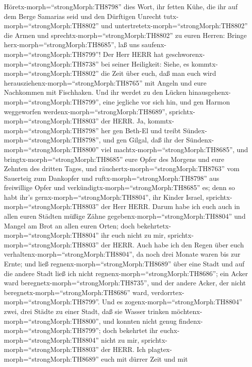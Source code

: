  Höretx-morph=``strongMorph:TH8798'' dies Wort, ihr fetten
Kühe, die ihr auf dem Berge Samarias seid und den Dürftigen Unrecht
tutx-morph=``strongMorph:TH8802'' und
untertretetx-morph=``strongMorph:TH8802'' die Armen und
sprechtx-morph=``strongMorph:TH8802'' zu euren Herren: Bringe
herx-morph=``strongMorph:TH8685'', laß uns
saufenx-morph=``strongMorph:TH8799''!  Der Herr HERR hat
geschworenx-morph=``strongMorph:TH8738'' bei seiner Heiligkeit: Siehe,
es kommtx-morph=``strongMorph:TH8802'' die Zeit über euch, daß man euch
wird herausziehenx-morph=``strongMorph:TH8765'' mit Angeln und eure
Nachkommen mit Fischhaken.  Und ihr werdet zu den Lücken
hinausgehenx-morph=``strongMorph:TH8799'', eine jegliche vor sich hin,
und gen Harmon weggeworfen werdenx-morph=``strongMorph:TH8689'',
sprichtx-morph=``strongMorph:TH8803'' der HERR.  Ja,
kommtx-morph=``strongMorph:TH8798'' her gen Beth-El und treibt
Sündex-morph=``strongMorph:TH8798'', und gen Gilgal, daß ihr der
Sündenx-morph=``strongMorph:TH8800'' viel
machtx-morph=``strongMorph:TH8685'', und
bringtx-morph=``strongMorph:TH8685'' eure Opfer des Morgens und eure
Zehnten des dritten Tages,  und
räuchertx-morph=``strongMorph:TH8763'' vom Sauerteig zum Dankopfer und
ruftx-morph=``strongMorph:TH8798'' aus freiwillige Opfer und
verkündigtx-morph=``strongMorph:TH8685'' es; denn so habt ihr's
gernx-morph=``strongMorph:TH8804'', ihr Kinder Israel,
sprichtx-morph=``strongMorph:TH8803'' der Herr HERR.  Darum
habe ich euch auch in allen euren Städten müßige Zähne
gegebenx-morph=``strongMorph:TH8804'' und Mangel am Brot an allen euren
Orten; doch bekehrtetx-morph=``strongMorph:TH8804'' ihr euch nicht zu
mir, sprichtx-morph=``strongMorph:TH8803'' der HERR.  Auch
habe ich den Regen über euch verhaltenx-morph=``strongMorph:TH8804'', da
noch drei Monate waren bis zur Ernte; und ließ
regnenx-morph=``strongMorph:TH8689'' über eine Stadt und auf die andere
Stadt ließ ich nicht regnenx-morph=``strongMorph:TH8686''; ein Acker
ward beregnetx-morph=``strongMorph:TH8735'', und der andere Acker, der
nicht beregnetx-morph=``strongMorph:TH8686'' ward,
verdorrtex-morph=``strongMorph:TH8799''.  Und es
zogenx-morph=``strongMorph:TH8804'' zwei, drei Städte zu einer Stadt,
daß sie Wasser trinken möchtenx-morph=``strongMorph:TH8800'', und
konnten nicht genug findenx-morph=``strongMorph:TH8799''; doch bekehrtet
ihr euchx-morph=``strongMorph:TH8804'' nicht zu mir,
sprichtx-morph=``strongMorph:TH8803'' der HERR.  Ich
plagtex-morph=``strongMorph:TH8689'' euch mit dürrer Zeit und mit
